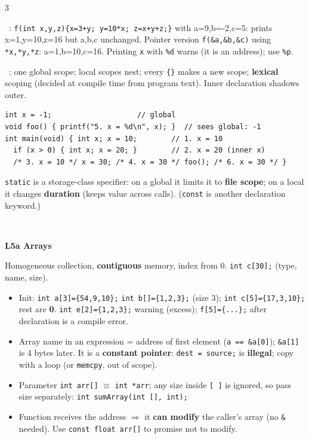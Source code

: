 \documentclass[landscape]{article}
\newcommand{\sect}[1]{\par\vspace{2pt}\noindent{\color{cur}\rule[-1.5pt]{\linewidth}{0.4pt}}\\[-7.5pt]%
  \noindent\colorbox{cur!12}{\parbox{\dimexpr\linewidth-2\fboxsep}{\color{cur}\bfseries #1}}\par\vspace{0.5pt}}
\newcommand{\sub}[1]{\par\vspace{1pt}{\color{cur}\bfseries #1}\ }
\newcommand{\key}[1]{\textbf{\color{BrickRed}#1}}
\newcommand{\tc}[1]{\texttt{#1}}
\begin{document}
\begin{multicols*}{3}
\begin{center}
\end{center}
\sub{Examples}: \tc{f(int x,y,z)\{x=3+y; y=10*x; z=x+y+z;\}} with a=9,b=-2,c=5: prints x=1,y=10,z=16 but a,b,c unchanged. Pointer version \tc{f(\&a,\&b,\&c)} using \tc{*x,*y,*z}: a=1,b=10,c=16. Printing \tc{x} with \tc{\%d} warns (it is an address); use \tc{\%p}.\\
\sub{Scoping}: one global scope; local scopes nest; every \tc{\{\}} makes a new scope; \key{lexical} scoping (decided at compile time from program text). Inner declaration shadows outer.
\begin{lstlisting}
int x = -1;                    // global
void foo() { printf("5. x = %d\n", x); }  // sees global: -1
int main(void) { int x; x = 10;        // 1. x = 10
  if (x > 0) { int x; x = 20; }        // 2. x = 20 (inner x)
  /* 3. x = 10 */ x = 30; /* 4. x = 30 */ foo(); /* 6. x = 30 */ }
\end{lstlisting}
\tc{static} is a storage-class specifier: on a global it limits it to \key{file scope}; on a local it changes \key{duration} (keeps value across calls). (\tc{const} is another declaration keyword.)

\sect{L5a \; Arrays}
Homogeneous collection, \key{contiguous} memory, index from 0. \tc{int c[30];} (type, name, size).
\begin{center}\end{center}
\begin{itemize}
\item Init: \tc{int a[3]=\{54,9,10\};} \tc{int b[]=\{1,2,3\};} (size 3); \tc{int c[5]=\{17,3,10\};} rest are \textbf{0}. \tc{int e[2]=\{1,2,3\};} warning (excess); \tc{f[5]=\{...\};} after declaration is a compile error.
\item Array name in an expression = address of first element (\tc{a == \&a[0]}); \tc{\&a[1]} is 4 bytes later. It is a \key{constant pointer}: \tc{dest = source;} is \textbf{illegal}; copy with a loop (or \tc{memcpy}, out of scope).
\item Parameter \tc{int arr[]} $\equiv$ \tc{int *arr}; any size inside \tc{[ ]} is ignored, so pass size separately: \tc{int sumArray(int [], int);}
\item Function receives the address $\Rightarrow$ it \key{can modify} the caller's array (no \tc{\&} needed). Use \tc{const float arr[]} to promise not to modify.
\end{itemize}


\end{multicols*}
\end{document}
